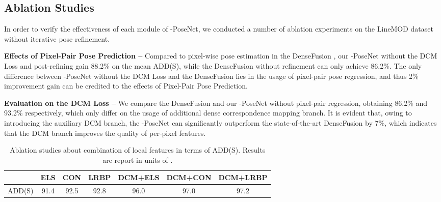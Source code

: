 \documentclass[letterpaper, 10 pt, conference]{ieeeconf}
\begin{document}
\subsection{Ablation Studies}
In order to verify the effectiveness of each module of -PoseNet, we conducted a number of ablation experiments on the LineMOD dataset without iterative pose refinement. 

\vspace{0.1cm}\noindent\textbf{Effects of Pixel-Pair Pose Prediction --}
Compared to pixel-wise pose estimation in the DenseFusion \cite{wang2019densefusion}, our -PoseNet without the DCM Loss and post-refining gain 88.2\% on the mean ADD(S), while the DenseFusion without refinement can only achieve 86.2\%.
The only difference between -PoseNet without the DCM Loss and the DenseFusion lies in the usage of pixel-pair pose regression, and thus 2\% improvement gain can be credited to the effects of Pixel-Pair Pose Prediction.


\vspace{0.1cm}\noindent\textbf{Evaluation on the DCM Loss --}
We compare the DenseFusion and our -PoseNet without pixel-pair regression, obtaining 86.2\% and 93.2\% respectively, which only differ on the usage of additional dense correspondence mapping branch.
It is evident that, owing to introducing the auxiliary DCM branch, the -PoseNet can significantly outperform the state-of-the-art DenseFusion by 7\%, which indicates that the DCM branch improves the quality of per-pixel features.












\begin{table}[h]
\begin{center}
\caption{Ablation studies about combination of local features in terms of ADD(S). 
Results are report in units of .}
\resizebox{0.9\linewidth}{!}
		{
		\begin{tabular}{r c c c || c c c}
\hline
 & ELS & CON  & LRBP & DCM+ELS & DCM+CON  & DCM+LRBP\\ 
\hline
ADD(S) & 91.4 & 92.5 & 92.8 & 96.0 & 97.0 & 97.2\\
\hline		
		\end{tabular}
}
\end{center}\vspace{-0.5cm}
\end{table}
\end{document}
